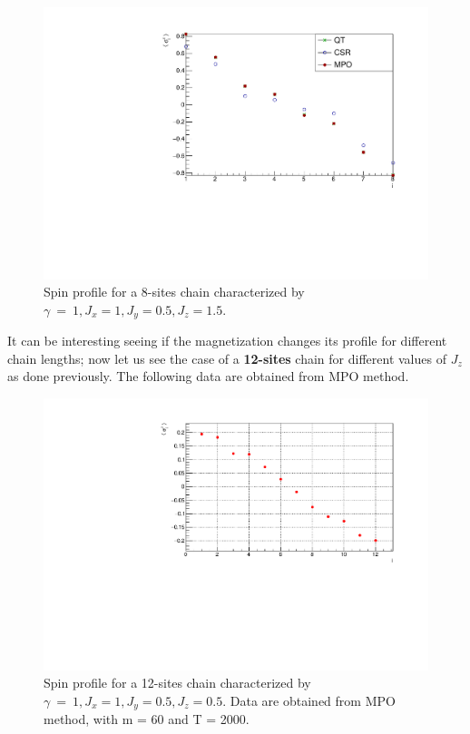 \begin{figure}[H]
    \centering
    \includegraphics[scale=0.7]{Figures/8sites/LM_8s_J10515.pdf}
    \caption{Spin profile for a 8-sites chain characterized by $\gamma~=~1, J_x=1, J_y=0.5, J_z=1.5$.}
    \label{fig:my_label}
\end{figure}

It can be interesting seeing if the magnetization changes its profile for different chain lengths; now let us see the case of a \textbf{12-sites} chain for different values of $J_z$ as done previously. The following data are obtained from MPO method.

\begin{figure}[H]
    \centering
    \includegraphics[scale=0.7]{Figures/12sites/LML012m060Time002000_J10505.pdf}
    \caption{Spin profile for a 12-sites chain characterized by $\gamma~=~1, J_x=1, J_y=0.5, J_z=0.5$. Data are obtained from MPO method, with m = 60 and T = 2000.}
    \label{fig:my_label}
\end{figure}

